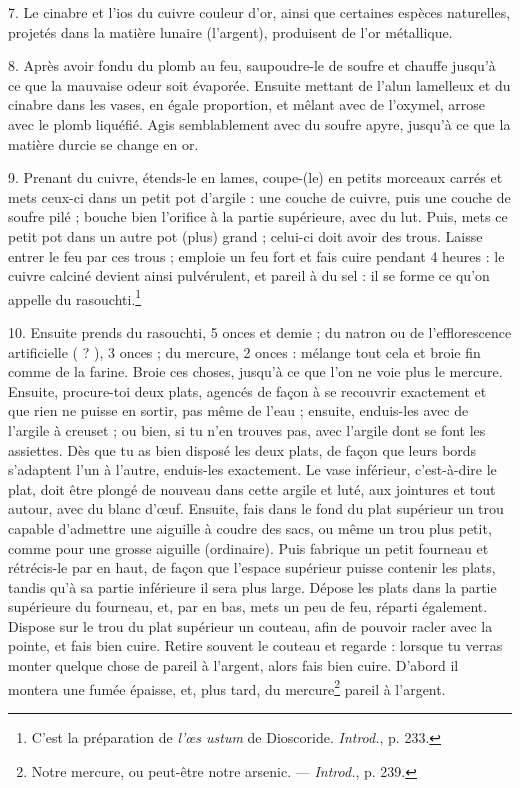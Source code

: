 \documentclass[a4paper, 11pt, oneside, polutonikogreek, french]{article}
\begin{document}
7. Le cinabre et l'ios du cuivre couleur d'or, ainsi que certaines espèces naturelles, projetés dans la matière lunaire (l'argent), produisent de l'or métallique.

8. Après avoir fondu du plomb au feu, saupoudre-le de soufre et chauffe jusqu'à ce que la mauvaise odeur soit évaporée. Ensuite mettant de l'alun lamelleux et du cinabre dans les vases, en égale proportion, et mêlant avec de l'oxymel, arrose avec le plomb liquéfié. Agis semblablement avec du soufre apyre, jusqu'à ce que la matière durcie se change en or.

9. Prenant du cuivre, étends-le en lames, coupe-(le) en petits morceaux carrés et mets ceux-ci dans un petit pot d'argile : une couche de cuivre, puis une couche de soufre pilé ; bouche bien l'orifice à la partie supérieure, avec du lut. Puis, mets ce petit pot dans un autre pot (plus) grand ; celui-ci doit avoir des trous. Laisse entrer le feu par ces trous ; emploie un feu fort et fais cuire pendant 4 heures : le cuivre calciné devient ainsi pulvérulent, et pareil à du sel : il se forme ce qu'on appelle du rasouchti.\footnote{C'est la préparation de \emph{l'œs ustum} de Dioscoride. \emph{Introd.}, p. 233.}

10. Ensuite prends du rasouchti, 5 onces et demie ; du natron ou de l'efflorescence artificielle ( ? ), 3 onces ; du mercure, 2 onces : mélange tout cela et broie fin comme de la farine. Broie ces choses, jusqu'à ce que l'on ne voie plus le mercure. Ensuite, procure-toi deux plats, agencés de façon à se recouvrir exactement et que rien ne puisse en sortir, pas même de l'eau ; ensuite, enduis-les avec de l'argile à creuset ; ou bien, si tu n'en trouves pas, avec l'argile dont se font les assiettes. Dès que tu as bien disposé les deux plats, de façon que leurs bords s'adaptent l'un à l'autre, enduis-les exactement. Le vase inférieur, c'est-à-dire le plat, doit être plongé de nouveau dans cette argile et luté, aux jointures et tout autour, avec du blanc d'œuf. Ensuite, fais dans le fond du plat supérieur un trou capable d'admettre une aiguille à coudre des sacs, ou même un trou plus petit, comme pour une grosse aiguille (ordinaire). Puis fabrique un petit fourneau et rétrécis-le par en haut, de façon que l'espace supérieur puisse contenir les plats, tandis qu'à sa partie inférieure il sera plus large. Dépose les plats dans la partie supérieure du fourneau, et, par en bas, mets un peu de feu, réparti également. Dispose sur le trou du plat supérieur un couteau, afin de pouvoir racler avec la pointe, et fais bien cuire. Retire souvent le couteau et regarde : lorsque tu verras monter quelque chose de pareil à l'argent, alors fais bien cuire. D'abord il montera une fumée épaisse, et, plus tard, du mercure\footnote{Notre mercure, ou peut-être notre arsenic. --- \emph{Introd.}, p. 239.} pareil à l'argent.
\end{document}
